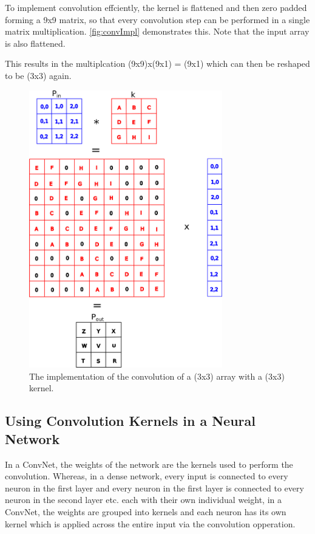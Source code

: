 To implement convolution effciently, the kernel is flattened and then zero padded forming a 9x9 matrix, so that every convolution step can be performed in a single matrix multiplication. \autoref{fig:convImpl} demonstrates this. Note that the input array is also flattened. 

This results in the multiplcation (9x9)x(9x1) = (9x1) which can then be reshaped to be (3x3) again.

\begin{figure}
	\centering	\includegraphics[width=0.75\textwidth]{Figs/intro2dl/convolutionImplementation.png}
	\caption{The implementation of the convolution of a (3x3) array with a (3x3) kernel.}
	\label{fig:convImpl}
\end{figure}

\subsection{Using Convolution Kernels in a Neural Network}
In a \ac{ConvNet}, the weights of the network are the kernels used to perform the convolution. Whereas, in a dense network, every input is connected to every neuron in the first layer and every neuron in the first layer is connected to every neuron in the second layer etc. each with their own individual weight, in a ConvNet, the weights are grouped into kernels and each neuron has its own kernel which is applied across the entire input via the convolution opperation.

